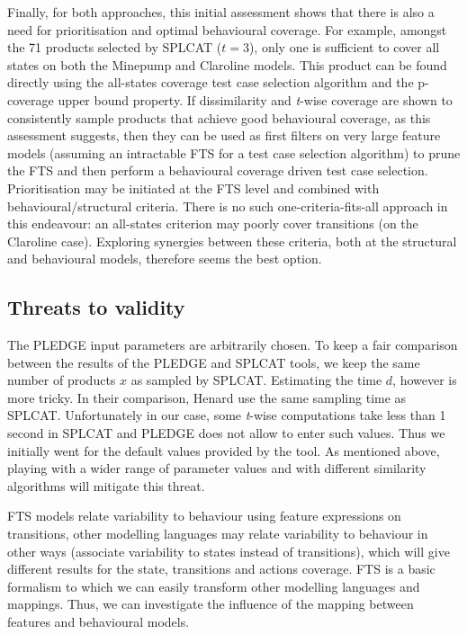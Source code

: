 Finally, for both approaches, this initial assessment shows that there is also a need for prioritisation and optimal behavioural coverage. For example, amongst the 71 products selected by SPLCAT ($t=3$), only one is sufficient to cover all states on both the Minepump and Claroline models. This product can be found directly using the all-states coverage test case selection algorithm and the p-coverage upper bound property. If dissimilarity and \textit{t}-wise coverage are shown to consistently sample products that achieve good behavioural coverage, as this assessment suggests, then they can be used as first filters on very large feature models (assuming an intractable FTS for a test case selection algorithm) to prune the FTS and then perform a behavioural coverage driven test case selection. Prioritisation may be initiated at the FTS level and combined with behavioural/structural criteria. There is no such one-criteria-fits-all approach in this endeavour: an all-states criterion may poorly cover transitions (\eg on the Claroline case).  Exploring synergies between these criteria, both at the structural and behavioural models, therefore seems the best option.   


\subsection{Threats to validity}


The PLEDGE input parameters are arbitrarily chosen. To keep a fair comparison between the results of the PLEDGE and SPLCAT tools, we keep the same number of products $x$ as sampled by SPLCAT. Estimating the time $d$, however is more tricky. In their comparison, Henard \etal \cite{Henard2014} use the same sampling time as SPLCAT. Unfortunately in our case, some \textit{t}-wise computations take less than 1 second in SPLCAT and PLEDGE does not allow to enter such values. Thus we initially went for the default values provided by the tool. As mentioned above, playing with a wider range of parameter values and with different similarity algorithms will mitigate this threat.

FTS models relate variability to behaviour using feature expressions on transitions, other modelling languages may relate variability to behaviour in other ways (\eg associate variability to states instead of transitions), which will give different results for the state, transitions and actions coverage. FTS is a basic formalism to which we can easily transform other modelling languages and mappings. Thus, we can investigate the influence of the mapping between features and behavioural models.    


